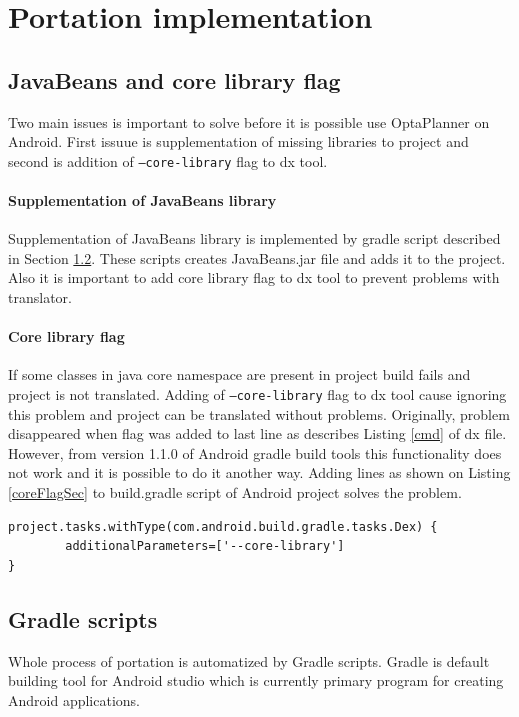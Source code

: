 \section{Portation implementation}

\subsection{JavaBeans and core library flag}\label{coreLib}
Two main issues is important to solve before it is possible use OptaPlanner on Android. First issuue is supplementation of
missing libraries to project and second is addition of \texttt{--core-library} flag to dx tool.

\paragraph{Supplementation of JavaBeans library}
Supplementation of JavaBeans library is implemented by gradle script described in Section \ref{gradleScripts}. These scripts
creates JavaBeans.jar file and adds it to the project. Also it is important to add core library flag to dx tool to prevent
problems with translator.

\paragraph{Core library flag}
If some classes in java core namespace are present in project build fails and project is not translated. Adding of
\texttt{--core-library} flag to dx tool cause ignoring this problem and project can be translated without problems.
Originally, problem disappeared when flag was added to last line as describes Listing \ref{cmd} of dx file. However, from
version 1.1.0 of Android gradle build tools this functionality does not work and it is possible to do it another way.
Adding lines as shown on Listing \ref{coreFlagSec} to build.gradle script of Android project solves the problem.
\\
\begin{lstlisting}[captionpos={b},caption={Addition of core library flag in build.gradle script},frame={lines},label={coreFlagSec},basicstyle=\footnotesize]
project.tasks.withType(com.android.build.gradle.tasks.Dex) {
        additionalParameters=['--core-library']
}
\end{lstlisting}

\subsection{Gradle scripts}\label{gradleScripts}
Whole process of portation is automatized by Gradle scripts. Gradle is default building tool for Android studio which is
currently primary program for creating Android applications.


